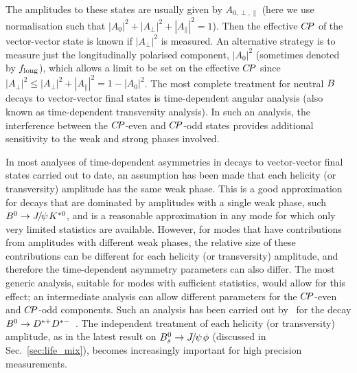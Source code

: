 The amplitudes to these states are usually given by $A_{0,\perp,\parallel}$
(here we use normalisation such that 
$| A_0 |^2 + | A_\perp |^2 + | A_\parallel |^2 = 1$).
Then the effective $C\!P$ of the vector-vector state is known if 
$| A_\perp |^2$ is measured.
An alternative strategy is to measure just the longitudinally polarised 
component,  $| A_0 |^2$
(sometimes denoted by $f_{\rm long}$), 
which allows a limit to be set on the effective $C\!P$ since
$| A_\perp |^2 \leq | A_\perp |^2 + | A_\parallel |^2 = 1 - | A_0 |^2$.
The most complete treatment for 
neutral $B$ decays to vector-vector final states
is time-dependent angular analysis 
(also known as time-dependent transversity analysis).
In such an analysis, 
the interference between the $C\!P$-even and $C\!P$-odd states 
provides additional sensitivity to the weak and strong phases involved.

In most analyses of time-dependent \CP asymmetries in decays to 
vector-vector final states carried out to date,
an assumption has been made that each helicity (or transversity) amplitude
has the same weak phase.
This is a good approximation for decays that are dominated by 
amplitudes with a single weak phase, such $B^0 \to {J\mskip -3mu/\mskip -2mu\psi\mskip 2mu} K^{*0}$,
and is a reasonable approximation in any mode for which only 
very limited statistics are available.
However, for modes that have contributions from amplitudes with different 
weak phases, the relative size of these contributions can be different 
for each helicity (or transversity) amplitude,
and therefore the time-dependent \CP asymmetry parameters can also differ.
The most generic analysis, suitable for modes with sufficient statistics,
would allow for this effect;
an intermediate analysis can allow different parameters for the 
$C\!P$-even and $C\!P$-odd components.
Such an analysis has been carried out by \babar\ for the decay
$B^0 \to D^{*+}D^{*-}$~\cite{Aubert:2008ah}.
The independent treatment of each helicity (or transversity) amplitude, as in the latest result on $B^0_s \to {J\mskip -3mu/\mskip -2mu\psi\mskip 2mu}\phi$ (discussed in Sec.~\ref{sec:life_mix}), becomes increasingly important for high precision measurements.

\label{sec:cp_uta:notations:dalitz}

